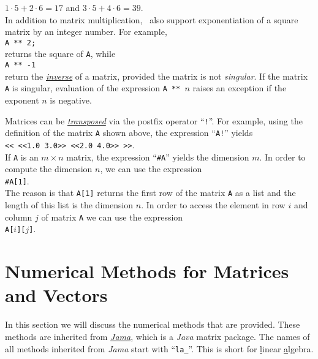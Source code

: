 $1 \cdot 5 + 2 \cdot 6 = 17$ \quad and \quad $3 \cdot 5 + 4 \cdot 6 = 39$.
\\[0.2cm]
In addition to matrix multiplication, \setlx\ also support exponentiation of a square matrix by an
integer number.  For example, 
\\[0.2cm]
\hspace*{1.3cm}
\texttt{A ** 2;}
\\[0.2cm]
returns the square  of \texttt{A}, while 
\\[0.2cm]
\hspace*{1.3cm}
\texttt{A ** -1}
\\[0.2cm]
return the \href{http://en.wikipedia.org/wiki/Invertible_matrix}{\emph{inverse}} of a matrix,
provided the matrix is not \emph{singular}.  If the matrix \texttt{A} is singular, evaluation of the
expression \texttt{A ** $n$} raises an exception if the exponent $n$ is negative.

Matrices can be \href{http://en.wikipedia.org/wiki/Transpose}{\emph{transposed}} via the postfix
operator ``\texttt{!}''.  For example, using the definition of the matrix \texttt{A} shown above,
the expression ``\texttt{A!}'' yields 
\\[0.2cm]
\hspace*{1.3cm}
\texttt{<< <<1.0 3.0>> <<2.0 4.0>> >>}.
\\[0.2cm]
If \texttt{A} is an $m \times n$ matrix, the expression ``\texttt{\#A}'' yields the dimension $m$.  
In order to compute the dimension $n$, we can use the expression 
\\[0.2cm]
\hspace*{1.3cm}
\texttt{\#A[1]}.
\\[0.2cm]
The reason is that \texttt{A[1]} returns the first row of the matrix \texttt{A} as a list and the
length of this list is the dimension $n$.  In order to access the element in row $i$ and column $j$
of matrix \texttt{A} we can use the expression
\\[0.2cm]
\hspace*{1.3cm}
\texttt{A[$i$][$j$]}.

\section{Numerical Methods for Matrices and Vectors}
In this section we will discuss the numerical methods that are provided.  These methods are inherited
from \href{http://math.nist.gov/javanumerics/jama/}{\textsl{Jama}}, which is a \textsl{Java} matrix
package.  The names of all methods inherited from \textsl{Jama} start with ``\texttt{la\_}''.  This
is short for \underline{l}inear \underline{a}lgebra.

